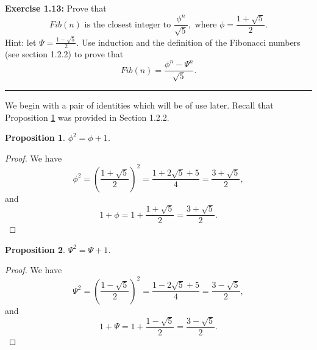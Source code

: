 \documentclass{article}
\newtheorem{proposition}{Proposition}
\begin{document}

\noindent \textbf{Exercise 1.13:} Prove that
\begin{equation*}
  \mathit{Fib}(n) \text{ is the closest integer to }
  \frac{ \phi^n }{ \sqrt{5} }, \text{ where } \phi = \frac{1 + \sqrt{5}}{2}.
\end{equation*}
Hint: let $\Psi = \frac{1 - \sqrt{5}}{2}$.  Use induction and the definition of
the Fibonacci numbers (see section 1.2.2) to prove that
\begin{equation*}
  \mathit{Fib}(n) = \frac{\phi^n - \Psi^n}{\sqrt{5}}.
\end{equation*}

\hrule
\vspace{10mm}





We begin with a pair of identities which will be of use later.  Recall that
Proposition \ref{phi-identity} was provided in Section 1.2.2.

\begin{proposition}
  \label{phi-identity}
  $\phi^2 = \phi + 1$.
\end{proposition}

\begin{proof}
  We have
  \begin{equation*}
    \phi^2
    = \left( \frac{ 1 + \sqrt{5} }{ 2 } \right)^2
    = \frac{ 1 + 2\sqrt{5} + 5 }{ 4 }
    = \frac{ 3 + \sqrt{5} }{ 2 },
  \end{equation*}
  and
  \begin{equation*}
    1 + \phi
    = 1 + \frac{ 1 + \sqrt{5} }{ 2 }
    = \frac{ 3 + \sqrt{5} }{ 2 }.
  \end{equation*}
\end{proof}
\vspace{5mm}





\begin{proposition}
  $\Psi^2 = \Psi + 1$.
\end{proposition}

\begin{proof}
  We have
  \begin{equation*}
    \Psi^2
    = \left( \frac{ 1 - \sqrt{5} }{ 2 } \right)^2
    = \frac{ 1 - 2\sqrt{5} + 5 }{ 4 }
    = \frac{ 3 - \sqrt{5} }{ 2 },
  \end{equation*}
  and
  \begin{equation*}
    1 + \Psi
    = 1 + \frac{ 1 - \sqrt{5} }{ 2 }
    = \frac{ 3 - \sqrt{5} }{ 2 }.
  \end{equation*}
\end{proof}
\vspace{5mm}
\end{document}
